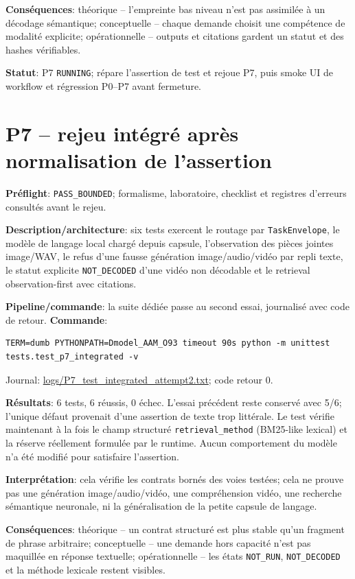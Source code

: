 \documentclass[11pt,a4paper,oneside]{report}
\begin{document}
\textbf{Conséquences}: théorique -- l'empreinte bas niveau n'est pas assimilée à un décodage sémantique; conceptuelle -- chaque demande choisit une compétence de modalité explicite; opérationnelle -- outputs et citations gardent un statut et des hashes vérifiables.

\textbf{Statut}: P7 \texttt{RUNNING}; répare l'assertion de test et rejoue P7, puis smoke UI de workflow et régression P0--P7 avant fermeture.


\section{P7 -- rejeu intégré après normalisation de l’assertion}
\textbf{Préflight}: \texttt{PASS\_BOUNDED}; formalisme, laboratoire, checklist et registres d’erreurs consultés avant le rejeu.

\textbf{Description/architecture}: six tests exercent le routage par \texttt{TaskEnvelope}, le modèle de langage local chargé depuis capsule, l’observation des pièces jointes image/WAV, le refus d’une fausse génération image/audio/vidéo par repli texte, le statut explicite \texttt{NOT\_DECODED} d’une vidéo non décodable et le retrieval observation-first avec citations.

\textbf{Pipeline/commande}: la suite dédiée passe au second essai, journalisé avec code de retour.
\textbf{Commande}:
\begin{lstlisting}[basicstyle=\ttfamily\small,breaklines=true]
TERM=dumb PYTHONPATH=Dmodel_AAM_O93 timeout 90s python -m unittest tests.test_p7_integrated -v
\end{lstlisting}
Journal: \url{logs/P7_test_integrated_attempt2.txt}; code retour 0.

\textbf{Résultats}: 6 tests, 6 réussis, 0 échec. L’essai précédent reste conservé avec 5/6; l’unique défaut provenait d’une assertion de texte trop littérale. Le test vérifie maintenant à la fois le champ structuré \texttt{retrieval\_method} (BM25-like lexical) et la réserve réellement formulée par le runtime. Aucun comportement du modèle n’a été modifié pour satisfaire l’assertion.

\textbf{Interprétation}: cela vérifie les contrats bornés des voies testées; cela ne prouve pas une génération image/audio/vidéo, une compréhension vidéo, une recherche sémantique neuronale, ni la généralisation de la petite capsule de langage.

\textbf{Conséquences}: théorique -- un contrat structuré est plus stable qu’un fragment de phrase arbitraire; conceptuelle -- une demande hors capacité n’est pas maquillée en réponse textuelle; opérationnelle -- les états \texttt{NOT\_RUN}, \texttt{NOT\_DECODED} et la méthode lexicale restent visibles.
\end{document}
